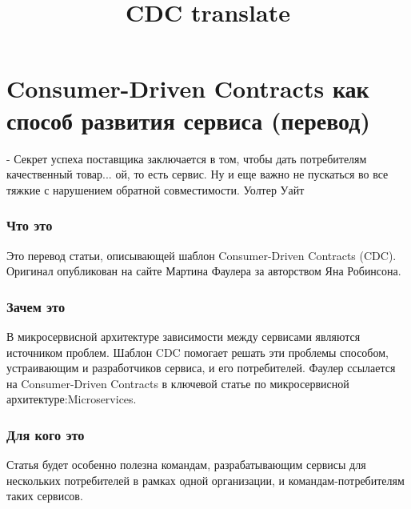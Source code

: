 \documentclass[11pt]{article}
\title{CDC translate}
\begin{document}
    
    
    \maketitle
    
    

    
    \section{Consumer-Driven Contracts как способ развития сервиса
(перевод)}\label{consumer-driven-contracts-ux43aux430ux43a-ux441ux43fux43eux441ux43eux431-ux440ux430ux437ux432ux438ux442ux438ux44f-ux441ux435ux440ux432ux438ux441ux430-ux43fux435ux440ux435ux432ux43eux434}

 - Секрет успеха поставщика заключается в том, чтобы дать потребителям
качественный товар... ой, то есть сервис. Ну и еще важно не пускаться во
все тяжкие с нарушением обратной совместимости. Уолтер Уайт

\subsubsection{Что это}\label{ux447ux442ux43e-ux44dux442ux43e}

Это перевод статьи, описывающей шаблон Consumer-Driven Contracts (CDC).
Оригинал опубликован на сайте Мартина Фаулера за авторством Яна
Робинсона.

\subsubsection{Зачем
это}\label{ux437ux430ux447ux435ux43c-ux44dux442ux43e}

В микросервисной архитектуре зависимости между сервисами являются
источником проблем. Шаблон CDC помогает решать эти проблемы способом,
устраивающим и разработчиков сервиса, и его потребителей. Фаулер
ссылается на Consumer-Driven Contracts в ключевой статье по
микросервисной архитектуре:Microservices.

\subsubsection{Для кого
это}\label{ux434ux43bux44f-ux43aux43eux433ux43e-ux44dux442ux43e}

Статья будет особенно полезна командам, разрабатывающим сервисы для
нескольких потребителей в рамках одной организации, и
командам-потребителям таких сервисов.
\end{document}
